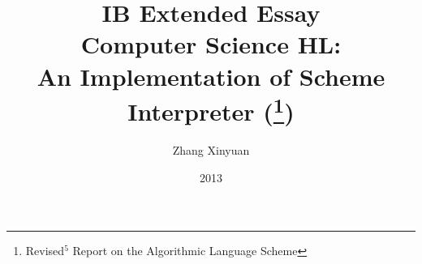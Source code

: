 \documentclass[a4paper]{article}
\title{
IB Extended Essay\\
Computer Science HL:\\
An Implementation of Scheme Interpreter
(\RFIVERS$\!\!$\footnote{Revised$^5$ Report on the Algorithmic Language Scheme})
}
\author{Zhang Xinyuan}
\date{2013}
\begin{document}


\maketitle

\newpage


\tableofcontents

% 







\begin{comment}
Hello, this is a test.

And test for math formula:

$$\int_0^1{f(t)e^{-2i\pi{}kt}}$$

And inlines: $\phi = \frac{\sqrt{5}\pm 1}{2}$

Test foot\footnote{this is a footnote.}note.

\underline{underline} is good, either \textit{itatlic} and
\emph{emphasis}.


try \verb verb texts

done.
\end{comment}
\end{document}

